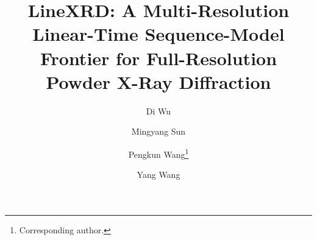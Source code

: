 \documentclass[final]{ws-ijwmip}
\begin{document}

\catchline{}{}{}{}{}

\title{LineXRD: A Multi-Resolution Linear-Time Sequence-Model Frontier for Full-Resolution Powder X-Ray Diffraction}

\author{Di Wu}

\address{University of Science and Technology of China,
Hefei 230000, Anhui, China\\
wdcxy@mail.ustc.edu.cn}

\author{Mingyang Sun}

\address{University of Science and Technology of China,
Hefei 230000, Anhui, China\\
flagger@mail.ustc.edu.cn}

\author{Pengkun Wang\footnote{Corresponding author.}}

\address{Suzhou Institute for Advanced Research,
University of Science and Technology of China,
Suzhou 215000, Jiangsu, China\\
pengkun@ustc.edu.cn}

\author{Yang Wang}

\address{Suzhou Institute for Advanced Research,
University of Science and Technology of China,
Suzhou 215000, Jiangsu, China\\
angyan@ustc.edu.cn}

\maketitle

\begin{history}
\end{history}
\end{document}
